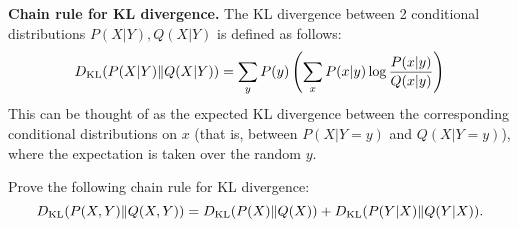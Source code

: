 \ifnum{} {
  \clearpage
} \fi
\item {}
\textbf{Chain rule for KL divergence.}
The KL divergence between 2
    conditional distributions $P(X|Y),Q(X|Y)$ is defined as follows:
    \[
    D_{\text{KL}}(P(X|Y)\|Q(X|Y)) = \sum_y P(y) \left(\sum_x
      P(x|y)\log\frac{P(x|y)}{Q(x|y)}\right)
    \]
    This can be thought of as the expected KL divergence between the
    corresponding conditional distributions on $x$ (that is, between
    $P(X|Y=y)$ and $Q(X|Y=y)$), where the expectation is taken over the
    random $y$.

    Prove the following chain rule for KL divergence:
    $$  D_{\text{KL}}(P(X,Y)\|Q(X,Y)) = D_{\text{KL}}(P(X)\|Q(X)) + D_{\text{KL}}(P(Y|X)\|Q(Y|X)). $$ \\
      
\ifnum{} {
  
} \fi
